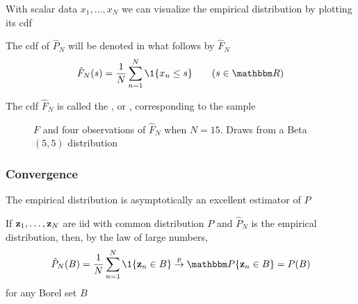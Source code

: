 \begin{frame}
    
    \vspace{2em}
    With scalar data $x_1, \ldots, x_N$ we can visualize the empirical
    distribution by plotting its {\sc cdf}
    
    \vspace{.7em}
    The {\sc cdf} of $\hat P_N$ will be
    denoted in what follows by $\hat F_N$
    \begin{equation*}
        \hat F_N(s) = \frac{1}{N} \sum_{n=1}^N \1\{x_n \leq s\} 
        \qquad (s \in \RR)
    \end{equation*}
    
    \vspace{.7em}
    The {\sc cdf} $\hat F_N$ is called the , or , corresponding to the sample
    
\end{frame}

\begin{frame}

    \begin{figure}
    \begin{center}
    \caption{\label{f:ecdf_beta} $F$ and four observations of $\hat F_N$ when $N=15$. 
                Draws from a Beta$(5,5)$ distribution }
   \end{center}
    \end{figure}
    
\end{frame}

\begin{frame}\frametitle{Convergence}

    \vspace{2em}
    The empirical distribution is asymptotically an excellent estimator of $P$
    
    \vspace{.7em}
    If ${\mathbf z}_1, \ldots, {\mathbf z}_N$ are {\sc iid} 
    with common distribution $P$ and $\hat P_N$ is the empirical distribution,
    then, by the law of large numbers,
    \begin{equation*}
        \hat P_N(B) = \frac{1}{N} \sum_{n=1}^N \1\{\boldz_n \in B\}
        \toprob 
        \PP\{\boldz_n \in B\} = P(B)
    \end{equation*}
    for any Borel set $B$
    
\end{frame}

